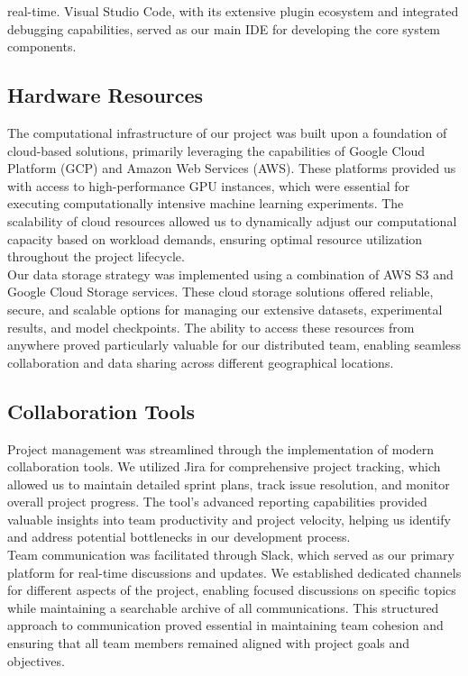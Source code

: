 real-time. Visual Studio Code, with its extensive plugin ecosystem and integrated debugging capabilities, served as our main IDE for developing the core system components.

\subsection{Hardware Resources}
The computational infrastructure of our project was built upon a foundation of cloud-based solutions, primarily leveraging the capabilities of Google Cloud Platform (GCP) and Amazon Web Services (AWS). These platforms provided us with access to high-performance GPU instances, which were essential for executing computationally intensive machine learning experiments. The scalability of cloud resources allowed us to dynamically adjust our computational capacity based on workload demands, ensuring optimal resource utilization throughout the project lifecycle.\\Our data storage strategy was implemented using a combination of AWS S3 and Google Cloud Storage services. These cloud storage solutions offered reliable, secure, and scalable options for managing our extensive datasets, experimental results, and model checkpoints. The ability to access these resources from anywhere proved particularly valuable for our distributed team, enabling seamless collaboration and data sharing across different geographical locations.

\subsection{Collaboration Tools}
Project management was streamlined through the implementation of modern collaboration tools. We utilized Jira for comprehensive project tracking, which allowed us to maintain detailed sprint plans, track issue resolution, and monitor overall project progress. The tool's advanced reporting capabilities provided valuable insights into team productivity and project velocity, helping us identify and address potential bottlenecks in our development process.\\Team communication was facilitated through Slack, which served as our primary platform for real-time discussions and updates. We established dedicated channels for different aspects of the project, enabling focused discussions on specific topics while maintaining a searchable archive of all communications. This structured approach to communication proved essential in maintaining team cohesion and ensuring that all team members remained aligned with project goals and objectives.

